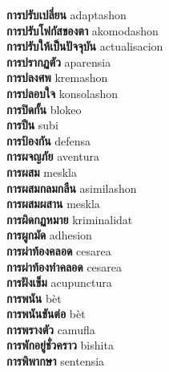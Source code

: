 \textbf{ การปรับเปลี่ยน  } adaptashon \\
\textbf{ การปรับโฟกัสของตา  } akomodashon \\
\textbf{ การปรับให้เป็นปัจจุบัน  } actualisacion \\
\textbf{ การปรากฏตัว  } aparensia \\
\textbf{ การปลงศพ  } kremashon \\
\textbf{ การปลอบใจ  } konsolashon \\
\textbf{ การปิดกั้น  } blokeo \\
\textbf{ การปีน  } subi \\
\textbf{ การป้องกัน  } defensa \\
\textbf{ การผจญภัย  } aventura \\
\textbf{ การผสม  } meskla \\
\textbf{ การผสมกลมกลืน  } asimilashon \\
\textbf{ การผสมผสาน  } meskla \\
\textbf{ การผิดกฏหมาย  } kriminalidat \\
\textbf{ การผูกมัด  } adhesion \\
\textbf{ การผ่าท้องคลอด  } cesarea \\
\textbf{ การผ่าท้องทำคลอด  } cesarea \\
\textbf{ การฝังเข็ม  } acupunctura \\
\textbf{ การพนัน  } bèt \\
\textbf{ การพนันขันต่อ  } bèt \\
\textbf{ การพรางตัว  } camufla \\
\textbf{ การพักอยู่ชั่วคราว  } bishita \\
\textbf{ การพิพากษา  } sentensia \\
